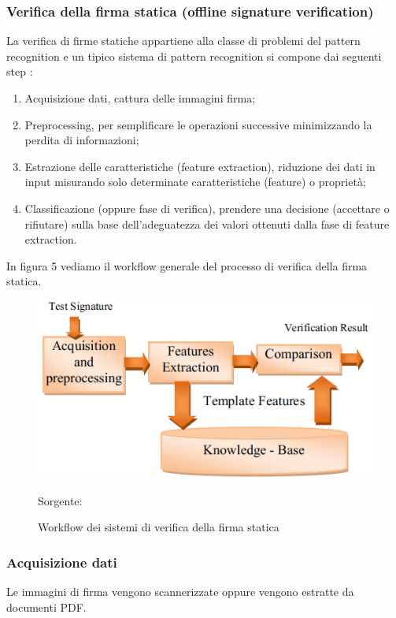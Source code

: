 \subsubsection{Verifica della firma statica (offline signature verification)}
\label{2.1.3}
La verifica di firme statiche appartiene alla classe di problemi del pattern recognition e un tipico sistema di pattern recognition si compone dai seguenti step \cite{2698894}:
\begin{enumerate}
\item Acquisizione dati, cattura delle immagini firma;
\item Preprocessing, per semplificare le operazioni successive minimizzando la perdita di informazioni;
\item Estrazione delle caratteristiche (feature extraction), riduzione dei dati in input misurando solo determinate caratteristiche (feature) o proprietà;
\item Classificazione (oppure fase di verifica), prendere una decisione (accettare o rifiutare) sulla base dell'adeguatezza dei valori ottenuti dalla fase di feature extraction.
\end{enumerate}
In figura 5 vediamo il workflow generale del processo di verifica della firma statica.
\begin{figure}[h!]
\centering
\includegraphics[scale=0.8]{../Logo&Header/generalProcess.png}
\caption{Workflow dei sistemi di verifica della firma statica} Sorgente: \cite{4}
\end{figure}
\subsubsection*{Acquisizione dati}
\label{2.1.3.1}
Le immagini di firma vengono scannerizzate oppure vengono estratte da documenti PDF.
